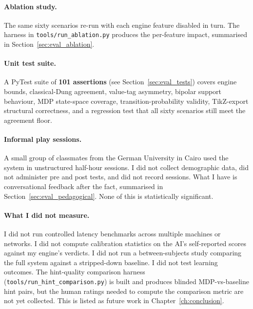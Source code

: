 \paragraph{Ablation study.}
The same sixty scenarios re-run with each engine feature disabled in turn. The harness in \texttt{tools/run\_ablation.py} produces the per-feature impact, summarised in Section~\ref{sec:eval_ablation}.

\paragraph{Unit test suite.}
A PyTest suite of \textbf{101 assertions} (see Section~\ref{sec:eval_tests}) covers engine bounds, classical-Dung agreement, value-tag asymmetry, bipolar support behaviour, MDP state-space coverage, transition-probability validity, TikZ-export structural correctness, and a regression test that all sixty scenarios still meet the agreement floor.

\paragraph{Informal play sessions.}
A small group of classmates from the German University in Cairo used the system in unstructured half-hour sessions. I did not collect demographic data, did not administer pre and post tests, and did not record sessions. What I have is conversational feedback after the fact, summarised in Section~\ref{sec:eval_pedagogical}. None of this is statistically significant.

\paragraph{What I did not measure.}
I did not run controlled latency benchmarks across multiple machines or networks. I did not compute calibration statistics on the AI's self-reported scores against my engine's verdicts. I did not run a between-subjects study comparing the full system against a stripped-down baseline. I did not test learning outcomes. The hint-quality comparison harness (\texttt{tools/run\_hint\_comparison.py}) is built and produces blinded MDP-vs-baseline hint pairs, but the human ratings needed to compute the comparison metric are not yet collected. This is listed as future work in Chapter~\ref{ch:conclusion}.

